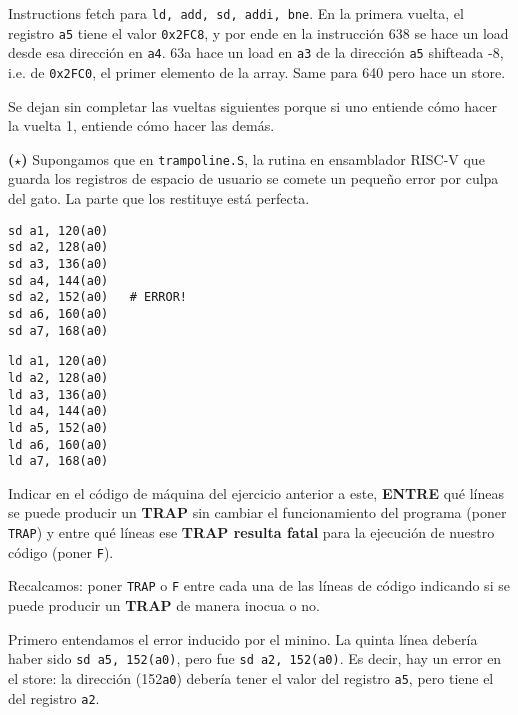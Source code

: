 \documentclass[12pt]{article}
\theoremstyle{definition}
\begin{document}
Instructions fetch para \texttt{ld, add, sd, addi, bne}. En la primera vuelta,
el registro \texttt{a5} tiene el valor \texttt{0x2FC8}, y por ende en la
instrucción 638 se hace un load desde esa dirección en \texttt{a4}. 63a hace un
load en \texttt{a3} de la dirección \texttt{a5} shifteada -8, i.e. de
\texttt{0x2FC0}, el primer elemento de la array. Same para 640 pero hace un
store.


Se dejan sin completar las vueltas siguientes porque si uno entiende cómo hacer
la vuelta 1, entiende cómo hacer las demás.

\pagebreak 

\begin{shaded}
\textbf{($\star$)} Supongamos que en \texttt{trampoline.S}, la rutina en
ensamblador RISC-V que guarda los registros de espacio de usuario se comete un
pequeño error por culpa del gato.  La parte que los restituye está perfecta.

\begin{minipage}{0.45\textwidth}
\begin{lstlisting}[style=riscv]
sd a1, 120(a0)
sd a2, 128(a0)
sd a3, 136(a0)
sd a4, 144(a0)
sd a2, 152(a0)   # ERROR!
sd a6, 160(a0)
sd a7, 168(a0)
\end{lstlisting}
\end{minipage}
\hfill
\begin{minipage}{0.45\textwidth}
\begin{lstlisting}[style=riscv]
ld a1, 120(a0)
ld a2, 128(a0)
ld a3, 136(a0)
ld a4, 144(a0)
ld a5, 152(a0)
ld a6, 160(a0)
ld a7, 168(a0)
\end{lstlisting}
\end{minipage}


Indicar en el código de máquina del ejercicio anterior a este, \textbf{ENTRE}
qué líneas se puede producir un \textbf{TRAP} sin cambiar el funcionamiento del
programa (poner \texttt{TRAP}) y entre qué líneas ese \textbf{TRAP resulta
fatal} para la ejecución de nuestro código (poner \texttt{F}).  

Recalcamos: poner \texttt{TRAP} o \texttt{F} entre cada una de las líneas de código indicando si se puede producir un 
\textbf{TRAP} de manera inocua o no.

\end{shaded}

Primero entendamos el error inducido por el minino. La quinta línea debería
haber sido \texttt{sd a5, 152(a0)}, pero fue \texttt{sd a2, 152(a0)}. Es decir,
hay un error en el store: la dirección (152\texttt{a0}) debería tener el valor
del registro \texttt{a5}, pero tiene el del registro \texttt{a2}.
\end{document}
